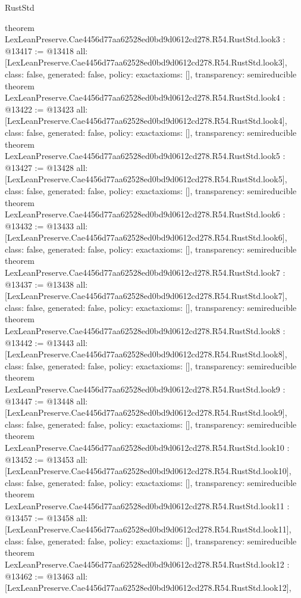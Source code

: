 \begin{lexlean}{RustStd}
\begin{coremodule}
{}
theorem LexLeanPreserve.Cae4456d77aa62528ed0bd9d0612cd278.R54.RustStd.look3 : @13417 := @13418 {
  all: [LexLeanPreserve.Cae4456d77aa62528ed0bd9d0612cd278.R54.RustStd.look3],
  class: false,
  generated: false,
  policy: exact{axioms: []},
  transparency: semireducible
}
theorem LexLeanPreserve.Cae4456d77aa62528ed0bd9d0612cd278.R54.RustStd.look4 : @13422 := @13423 {
  all: [LexLeanPreserve.Cae4456d77aa62528ed0bd9d0612cd278.R54.RustStd.look4],
  class: false,
  generated: false,
  policy: exact{axioms: []},
  transparency: semireducible
}
theorem LexLeanPreserve.Cae4456d77aa62528ed0bd9d0612cd278.R54.RustStd.look5 : @13427 := @13428 {
  all: [LexLeanPreserve.Cae4456d77aa62528ed0bd9d0612cd278.R54.RustStd.look5],
  class: false,
  generated: false,
  policy: exact{axioms: []},
  transparency: semireducible
}
theorem LexLeanPreserve.Cae4456d77aa62528ed0bd9d0612cd278.R54.RustStd.look6 : @13432 := @13433 {
  all: [LexLeanPreserve.Cae4456d77aa62528ed0bd9d0612cd278.R54.RustStd.look6],
  class: false,
  generated: false,
  policy: exact{axioms: []},
  transparency: semireducible
}
theorem LexLeanPreserve.Cae4456d77aa62528ed0bd9d0612cd278.R54.RustStd.look7 : @13437 := @13438 {
  all: [LexLeanPreserve.Cae4456d77aa62528ed0bd9d0612cd278.R54.RustStd.look7],
  class: false,
  generated: false,
  policy: exact{axioms: []},
  transparency: semireducible
}
theorem LexLeanPreserve.Cae4456d77aa62528ed0bd9d0612cd278.R54.RustStd.look8 : @13442 := @13443 {
  all: [LexLeanPreserve.Cae4456d77aa62528ed0bd9d0612cd278.R54.RustStd.look8],
  class: false,
  generated: false,
  policy: exact{axioms: []},
  transparency: semireducible
}
theorem LexLeanPreserve.Cae4456d77aa62528ed0bd9d0612cd278.R54.RustStd.look9 : @13447 := @13448 {
  all: [LexLeanPreserve.Cae4456d77aa62528ed0bd9d0612cd278.R54.RustStd.look9],
  class: false,
  generated: false,
  policy: exact{axioms: []},
  transparency: semireducible
}
theorem LexLeanPreserve.Cae4456d77aa62528ed0bd9d0612cd278.R54.RustStd.look10 : @13452 := @13453 {
  all: [LexLeanPreserve.Cae4456d77aa62528ed0bd9d0612cd278.R54.RustStd.look10],
  class: false,
  generated: false,
  policy: exact{axioms: []},
  transparency: semireducible
}
theorem LexLeanPreserve.Cae4456d77aa62528ed0bd9d0612cd278.R54.RustStd.look11 : @13457 := @13458 {
  all: [LexLeanPreserve.Cae4456d77aa62528ed0bd9d0612cd278.R54.RustStd.look11],
  class: false,
  generated: false,
  policy: exact{axioms: []},
  transparency: semireducible
}
theorem LexLeanPreserve.Cae4456d77aa62528ed0bd9d0612cd278.R54.RustStd.look12 : @13462 := @13463 {
  all: [LexLeanPreserve.Cae4456d77aa62528ed0bd9d0612cd278.R54.RustStd.look12],
}
\end{coremodule}
\end{lexlean}
